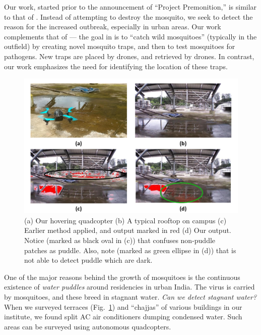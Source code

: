 \documentclass[11pt]{article}
\begin{document}
Our work, started prior to the announcement of ``Project
Premonition,'' is similar to that of \cite{Microsoft15}.  Instead of
attempting to destroy the mosquito, we seek to detect the reason for
the increased outbreak, especially in urban areas.  Our work complements that
of \cite{Microsoft15} --- the goal in \cite{Microsoft15} is to ``catch wild
mosquitoes'' (typically in the outfield) by creating novel mosquito traps, and
then to test mosquitoes for pathogens. New traps are placed by drones, and
retrieved by drones. In contrast, our work emphasizes the need for
identifying the location of these traps.  

\begin{figure}[h!]
\centering
\includegraphics[width=\linewidth]{stagnantWater/figures/teaser.pdf}
\caption{(a) Our hovering quadcopter (b) A typical
  rooftop on campus (c) Earlier method \cite{rankin2004daytime} applied, and
  output marked in red (d) Our output. Notice (marked as black oval in
  (c)) that \cite{rankin2004daytime} confuses non-puddle patches as puddle.
  Also, note (marked as green ellipse in (d)) that \cite{rankin2004daytime} is
  not able to detect puddle which are dark.}
\label{teaser} 
\end{figure}

One of the major reasons behind the growth of mosquitoes is the
continuous existence of \emph{water puddles} around residencies in
urban India.  The virus is carried by mosquitoes, and these breed in
stagnant water. \emph{Can we detect stagnant water?}  When we surveyed
terraces (Fig.~\ref{teaser}) and ``chajjas'' of various buildings in
our institute, we found split AC air conditioners dumping condensed
water. Such areas can be surveyed using autonomous quadcopters.
\end{document}
